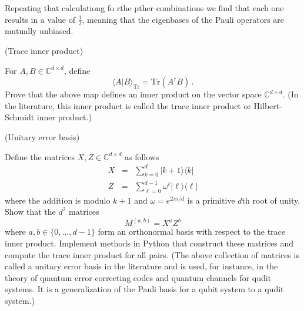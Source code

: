 \documentclass[12pt]{article}
\renewcommand{\>}{\rangle}
\newcommand{\<}{\langle}
\newcommand{\C}{\mathbb{C}}
\begin{document}
Repeating that calculationg fo rthe pther combinations we find that each one results in a value of $\frac{1}{2}$, meaning that the eigenbases of the Pauli operators are mutually unbiased.

\newpage


 (Trace inner product)

\medskip
\noindent
For $A,B\in\C^{d\times d}$, define
\[
\< A | B\>_{\mathrm{Tr}} = \mathrm{Tr}(A^\dagger B)\,.
\]
Prove that the above map defines an inner product on the vector space $\C^{d\times d}$. (In the literature, this inner product is called the trace inner product or Hilbert-Schmidt inner product.)




\newpage


 (Unitary error basis)

\noindent
Define the matrices $X,Z\in\C^{d\times d}$ as follows
\begin{eqnarray}
X & = & \sum_{k=0}^d |k+1\>\<k| \\
Z & = & \sum_{\ell=0}^{d-1} \omega^\ell |\ell\>\<\ell|
\end{eqnarray}
where the addition is modulo $k+1$ and $\omega=e^{2\pi i/d}$ is a primitive $d$th root of unity. Show that the $d^2$ matrices
\[
M^{(a,b)} = X^a Z^b
\]
where $a,b\in\{0,\ldots, d-1\}$ form an orthonormal basis with respect to the trace inner product. Implement methods in Python that construct these matrices and compute the trace inner product for all pairs. (The above collection of matrices is called a unitary error basis in the literature and is used, for instance, in the theory of quantum error correcting codes and quantum channels for qudit systems. It is a generalization of the Pauli basis for a qubit system to a qudit system.)
\end{document}
